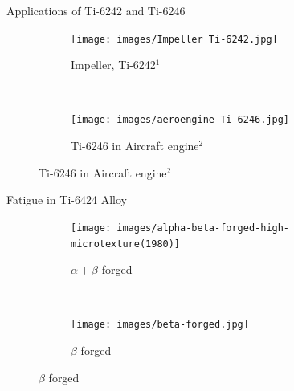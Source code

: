 \documentclass[10pt]{beamer}
\begin{document}
{%
\begin{frame}[fragile]{Applications of Ti-6242 and Ti-6246}

\begin{figure}[H]
    \centering
    \begin{subfigure}{0.40\textwidth}
        \texttt{[image: images/Impeller Ti-6242.jpg]}
        \caption{Impeller, Ti-6242$^{1}$}
        \end{subfigure}
    ~
    \begin{subfigure}{0.45\textwidth}
        \texttt{[image: images/aeroengine Ti-6246.jpg]}
        \caption{Ti-6246 in Aircraft engine$^{2}$}
    \end{subfigure}
      
\end{figure}

\end{frame}
}

{%
\begin{frame}[fragile]{Fatigue in Ti-6424 Alloy}

\begin{figure}[H]
    \centering
    \begin{subfigure}{0.40\textwidth}
        \texttt{[image: images/alpha-beta-forged-high-microtexture(1980)]}
        \caption{\tiny  $\alpha+\beta$ forged}
        \label{fig:Ti-6242 Surface}
    \end{subfigure}
    ~
    \begin{subfigure}{0.40\textwidth}
        \texttt{[image: images/beta-forged.jpg]}
        \caption{\tiny $\beta$ forged}
        \label{fig:Ti-6242 Surface}
    \end{subfigure}  
\end{figure}      

\vspace{-10mm}  
  
\begin{table}[]
\end{table}
    
\end{frame}
}
\end{document}
